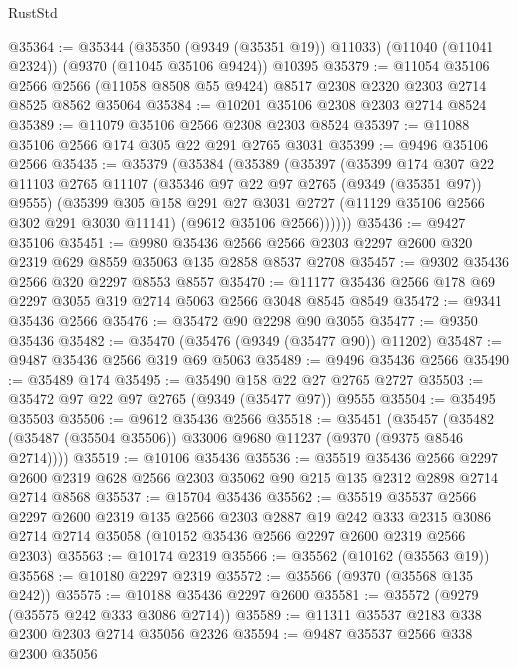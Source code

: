 \begin{lexlean}{RustStd}
\begin{coremodule}
@35364 := @35344
    (@35350 (@9349 (@35351 @19)) @11033)
    (@11040 (@11041 @2324))
    (@9370 (@11045 @35106 @9424))
    @10395
@35379 := @11054
    @35106
    @2566
    @2566
    (@11058 @8508 @55 @9424)
    @8517
    @2308
    @2320
    @2303
    @2714
    @8525
    @8562
    @35064
@35384 := @10201 @35106 @2308 @2303 @2714 @8524
@35389 := @11079 @35106 @2566 @2308 @2303 @8524
@35397 := @11088 @35106 @2566 @174 @305 @22 @291 @2765 @3031
@35399 := @9496 @35106 @2566
@35435 := @35379
    (@35384
      (@35389
        (@35397
          (@35399
            @174
            @307
            @22
            @11103
            @2765
            @11107
            (@35346 @97 @22 @97 @2765 (@9349 (@35351 @97)) @9555)
            (@35399
              @305
              @158
              @291
              @27
              @3031
              @2727
              (@11129 @35106 @2566 @302 @291 @3030 @11141)
              (@9612 @35106 @2566))))))
@35436 := @9427 @35106
@35451 := @9980
    @35436
    @2566
    @2566
    @2303
    @2297
    @2600
    @320
    @2319
    @629
    @8559
    @35063
    @135
    @2858
    @8537
    @2708
@35457 := @9302 @35436 @2566 @320 @2297 @8553 @8557
@35470 := @11177 @35436 @2566 @178 @69 @2297 @3055 @319 @2714 @5063 @2566 @3048 @8545 @8549
@35472 := @9341 @35436 @2566
@35476 := @35472 @90 @2298 @90 @3055
@35477 := @9350 @35436
@35482 := @35470 (@35476 (@9349 (@35477 @90)) @11202)
@35487 := @9487 @35436 @2566 @319 @69 @5063
@35489 := @9496 @35436 @2566
@35490 := @35489 @174
@35495 := @35490 @158 @22 @27 @2765 @2727
@35503 := @35472 @97 @22 @97 @2765 (@9349 (@35477 @97)) @9555
@35504 := @35495 @35503
@35506 := @9612 @35436 @2566
@35518 := @35451
    (@35457 (@35482 (@35487 (@35504 @35506)) @33006 @9680 @11237 (@9370 (@9375 @8546 @2714))))
@35519 := @10106 @35436
@35536 := @35519
    @35436
    @2566
    @2297
    @2600
    @2319
    @628
    @2566
    @2303
    @35062
    @90
    @215
    @135
    @2312
    @2898
    @2714
    @2714
    @8568
@35537 := @15704 @35436
@35562 := @35519
    @35537
    @2566
    @2297
    @2600
    @2319
    @135
    @2566
    @2303
    @2887
    @19
    @242
    @333
    @2315
    @3086
    @2714
    @2714
    @35058
    (@10152 @35436 @2566 @2297 @2600 @2319 @2566 @2303)
@35563 := @10174 @2319
@35566 := @35562 (@10162 (@35563 @19))
@35568 := @10180 @2297 @2319
@35572 := @35566 (@9370 (@35568 @135 @242))
@35575 := @10188 @35436 @2297 @2600
@35581 := @35572 (@9279 (@35575 @242 @333 @3086 @2714))
@35589 := @11311 @35537 @2183 @338 @2300 @2303 @2714 @35056 @2326
@35594 := @9487 @35537 @2566 @338 @2300 @35056

\end{coremodule}
\end{lexlean}
